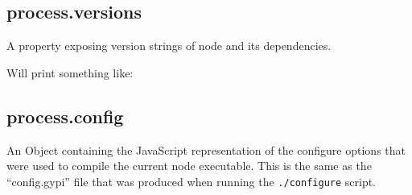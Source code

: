 \begin{Shaded}
\begin{Highlighting}[]
\NormalTok{(} \NormalTok{+ }\NormalTok{);}
\end{Highlighting}
\end{Shaded}

\subsection{process.versions}\label{process.versions}

A property exposing version strings of node and its dependencies.

\begin{Shaded}
\begin{Highlighting}[]
\NormalTok{(}\NormalTok{);}
\end{Highlighting}
\end{Shaded}

Will print something like:

\begin{Shaded}
\begin{Highlighting}[]
\NormalTok{\{ }\NormalTok{: }\NormalTok{,}
  \NormalTok{: }\NormalTok{,}
  \NormalTok{: }\NormalTok{,}
  \NormalTok{: }\NormalTok{,}
  \NormalTok{: }\NormalTok{,}
  \NormalTok{: }\NormalTok{,}
  \NormalTok{: }\NormalTok{,}
  \NormalTok{: } \NormalTok{\}}
\end{Highlighting}
\end{Shaded}

\subsection{process.config}\label{process.config}

An Object containing the JavaScript representation of the configure
options that were used to compile the current node executable. This is
the same as the ``config.gypi'' file that was produced when running the
\texttt{./configure} script.


